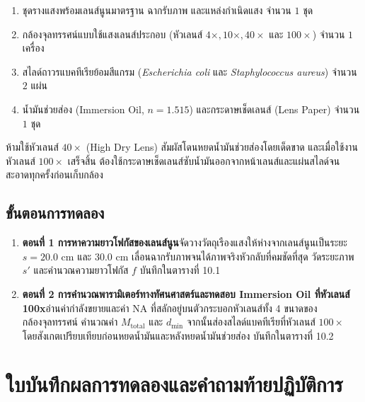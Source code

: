 \begin{equipbox}
\begin{enumerate}
    \item ชุดรางแสงพร้อมเลนส์นูนมาตรฐาน ฉากรับภาพ และแหล่งกำเนิดแสง จำนวน $1$ ชุด
    \item กล้องจุลทรรศน์แบบใช้แสงเลนส์ประกอบ (หัวเลนส์ $4\times, 10\times, 40\times$ และ $100\times$) จำนวน $1$ เครื่อง
    \item สไลด์ถาวรแบคทีเรียย้อมสีแกรม (\textit{Escherichia coli} และ \textit{Staphylococcus aureus}) จำนวน $2$ แผ่น
    \item น้ำมันช่วยส่อง (Immersion Oil, $n = 1.515$) และกระดาษเช็ดเลนส์ (Lens Paper) จำนวน $1$ ชุด
\end{enumerate}
\end{equipbox}

\begin{warningbox}
ห้ามใช้หัวเลนส์ $40\times$ (High Dry Lens) สัมผัสโดนหยดน้ำมันช่วยส่องโดยเด็ดขาด และเมื่อใช้งานหัวเลนส์ $100\times$ เสร็จสิ้น ต้องใช้กระดาษเช็ดเลนส์ซับน้ำมันออกจากหน้าเลนส์และแผ่นสไลด์จนสะอาดทุกครั้งก่อนเก็บกล้อง
\end{warningbox}

\subsection{ขั้นตอนการทดลอง}
\begin{enumerate}
    \item \textbf{ตอนที่ 1 การหาความยาวโฟกัสของเลนส์นูน}\quad จัดวางวัตถุเรืองแสงให้ห่างจากเลนส์นูนเป็นระยะ $s = 20.0\text{ cm}$ และ $30.0\text{ cm}$ เลื่อนฉากรับภาพจนได้ภาพจริงหัวกลับที่คมชัดที่สุด วัดระยะภาพ $s'$ และคำนวณความยาวโฟกัส $f$ บันทึกใน\mbox{ตารางที่} 10.1
    \item \textbf{ตอนที่ 2 การคำนวณพารามิเตอร์ทางทัศนศาสตร์และทดสอบ Immersion Oil ที่หัวเลนส์ 100x}\quad อ่านค่ากำลังขยายและค่า $\text{NA}$ ที่สลักอยู่บนตัวกระบอกหัวเลนส์ทั้ง 4 ขนาดของกล้องจุลทรรศน์ คำนวณค่า $M_{\text{total}}$ และ $d_{\min}$ จากนั้นส่องสไลด์แบคทีเรียที่หัวเลนส์ $100\times$ โดยสังเกตเปรียบเทียบก่อนหยดน้ำมันและหลังหยดน้ำมันช่วยส่อง บันทึกใน\mbox{ตารางที่} 10.2
\end{enumerate}

\section{ใบบันทึกผลการทดลองและคำถามท้ายปฏิบัติการ}

